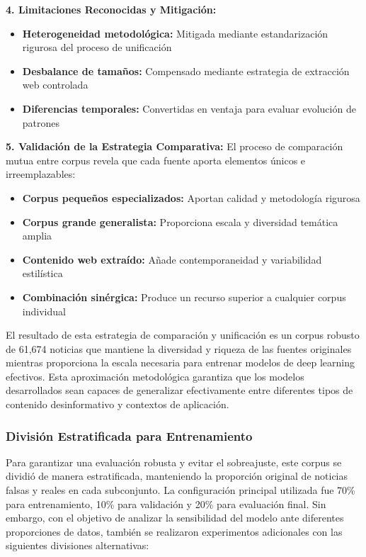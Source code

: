 \textbf{4. Limitaciones Reconocidas y Mitigación:}
\begin{itemize}
    \item \textbf{Heterogeneidad metodológica:} Mitigada mediante estandarización rigurosa del proceso de unificación
    \item \textbf{Desbalance de tamaños:} Compensado mediante estrategia de extracción web controlada
    \item \textbf{Diferencias temporales:} Convertidas en ventaja para evaluar evolución de patrones
\end{itemize}

\textbf{5. Validación de la Estrategia Comparativa:}
El proceso de comparación mutua entre corpus revela que cada fuente aporta elementos únicos e irreemplazables:
\begin{itemize}
    \item \textbf{Corpus pequeños especializados:} Aportan calidad y metodología rigurosa
    \item \textbf{Corpus grande generalista:} Proporciona escala y diversidad temática amplia
    \item \textbf{Contenido web extraído:} Añade contemporaneidad y variabilidad estilística
    \item \textbf{Combinación sinérgica:} Produce un recurso superior a cualquier corpus individual
\end{itemize}

El resultado de esta estrategia de comparación y unificación es un corpus robusto de 61,674 noticias que mantiene la diversidad y riqueza de las fuentes originales mientras proporciona la escala necesaria para entrenar modelos de deep learning efectivos. Esta aproximación metodológica garantiza que los modelos desarrollados sean capaces de generalizar efectivamente entre diferentes tipos de contenido desinformativo y contextos de aplicación.

\subsubsection{División Estratificada para Entrenamiento}

Para garantizar una evaluación robusta y evitar el sobreajuste, este corpus se dividió de manera estratificada, manteniendo la proporción original de noticias falsas y reales en cada subconjunto. La configuración principal utilizada fue 70\% para entrenamiento, 10\% para validación y 20\% para evaluación final. Sin embargo, con el objetivo de analizar la sensibilidad del modelo ante diferentes proporciones de datos, también se realizaron experimentos adicionales con las siguientes divisiones alternativas:

